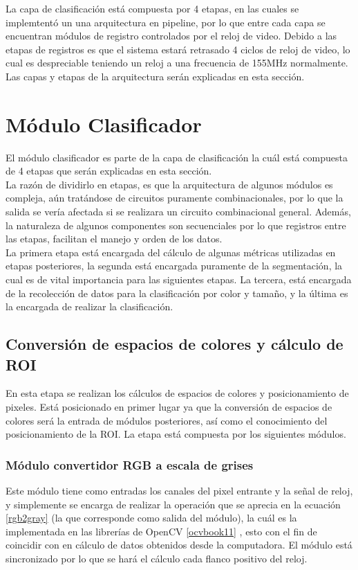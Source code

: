 \documentclass[twoside,spanish,ESP,MSc]{plantillaLabUPV}
\theoremstyle{definition}
\begin{document}
La capa de clasificación está compuesta por 4 etapas, en las cuales se implemtentó un  una arquitectura en pipeline, por lo que entre cada capa se encuentran módulos de registro controlados por el reloj de video. Debido a las etapas de registros es que el sistema estará retrasado 4 ciclos de reloj de video, lo cual es despreciable teniendo un reloj a una frecuencia de 155MHz normalmente. Las capas y etapas de la arquitectura serán explicadas en esta sección.

\section{Módulo Clasificador} \label{clasificador}

El módulo clasificador es parte de la capa de clasificación la cuál está compuesta de 4 etapas que serán explicadas en esta sección. \\

La razón de dividirlo en etapas, es que la arquitectura de algunos módulos es compleja, aún tratándose de circuitos puramente combinacionales, por lo que la salida se vería afectada si se realizara un circuito combinacional general. Además, la naturaleza de algunos componentes son secuenciales por lo que registros entre las etapas, facilitan el manejo y orden de los datos.\\

La primera etapa está encargada del cálculo de algunas métricas utilizadas en etapas posteriores, la segunda está encargada puramente de la segmentación, la cual es de vital importancia para las siguientes etapas. La tercera, está encargada de la recolección de datos para la clasificación por color y tamaño, y la última es la encargada de realizar la clasificación.

\subsection{Conversión de espacios de colores y cálculo de ROI}
En esta etapa se realizan los cálculos de espacios de colores y posicionamiento de pixeles. Está posicionado en primer lugar ya que la conversión de espacios de colores será la entrada de módulos posteriores, así como el conocimiento del posicionamiento de la ROI. La etapa está compuesta por los siguientes módulos.

\subsubsection{Módulo convertidor RGB a escala de grises}
Este módulo tiene como entradas los canales del pixel entrante y la señal de reloj, y simplemente se encarga de realizar la operación que se aprecia en la ecuación \ref{rgb2gray} (la que corresponde como salida del módulo), la cuál es la implementada en las librerías de OpenCV \ref{ocvbook11}%
 , esto con el fin de coincidir con en cálculo de datos obtenidos desde la computadora. El módulo está sincronizado por lo que se hará el cálculo cada flanco positivo del reloj.
\end{document}

